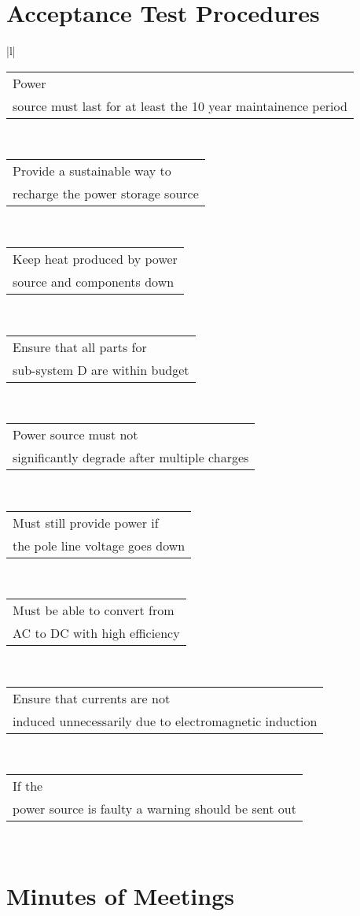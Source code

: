 \documentclass[12pt]{article}
\begin{document}
\section{Acceptance Test Procedures}
\begin{center}
\begin{table}[tbh]
\begin{tabular}{|l|}
\hline
{}    \\ \hline
\begin{tabular}[c]{@{}l@{}}Power\\   source must last for at least the 10 year maintainence period\end{tabular} \\ \hline
\begin{tabular}[c]{@{}l@{}}Provide a sustainable way to\\   recharge the power storage source\end{tabular}      \\ \hline
\begin{tabular}[c]{@{}l@{}}Keep heat produced by power\\   source and components down\end{tabular}              \\ \hline
\begin{tabular}[c]{@{}l@{}}Ensure that all parts for\\   sub-system D are within budget\end{tabular}            \\ \hline
\begin{tabular}[c]{@{}l@{}}Power source must not\\   significantly degrade after multiple charges\end{tabular}  \\ \hline
\begin{tabular}[c]{@{}l@{}}Must still provide power if\\   the pole line voltage goes down\end{tabular}         \\ \hline
\begin{tabular}[c]{@{}l@{}}Must be able to convert from\\   AC to DC with high efficiency\end{tabular}          \\ \hline
\begin{tabular}[c]{@{}l@{}}Ensure that currents are not\\   induced unnecessarily due to electromagnetic induction\end{tabular} \\ \hline
\begin{tabular}[c]{@{}l@{}}If the\\   power source is faulty a warning should be sent out\end{tabular}          \\ \hline
\end{tabular}
\end{table}
\end{center}
\newpage
\section{Minutes of Meetings}

\newpage
%
%
\end{document}
